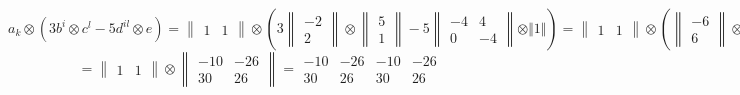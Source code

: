 \documentclass{article}
\begin{document}
\begin{center}
$$a_k \otimes \left (3b^i \otimes c^l - 5d^{il} \otimes e\right ) = \begin{Vmatrix}1 & 1\end{Vmatrix} \otimes \left ( 3\begin{Vmatrix}-2 \\ 2\end{Vmatrix} \otimes \begin{Vmatrix}5 \\ 1\end{Vmatrix} - 5\begin{Vmatrix}-4 & 4 \\ 0 & -4\end{Vmatrix} \otimes \Vert1\Vert\right ) = \begin{Vmatrix}1 & 1\end{Vmatrix} \otimes \left ( \begin{Vmatrix}-6 \\ 6\end{Vmatrix} \otimes \begin{Vmatrix}5 \\ 1\end{Vmatrix} - \begin{Vmatrix}-20 & 20 \\ 0 & -20\end{Vmatrix} \otimes \Vert1\Vert\right) = \begin{Vmatrix}1 & 1\end{Vmatrix} \otimes \left( \begin{Vmatrix}-30 & -6 \\ 30 & 6\end{Vmatrix} - \begin{Vmatrix}-20 & 20 \\ 0 & -20\end{Vmatrix}\right) = $$
$$= \begin{Vmatrix}1 & 1\end{Vmatrix} \otimes \begin{Vmatrix}-10 & -26 \\ 30 & 26\end{Vmatrix} = \begin{array}{||cc|cc||}
-10 & -26 & -10 & -26 \\
30 & 26 & 30 & 26
\end{array}$$
\end{center}
\end{document}
